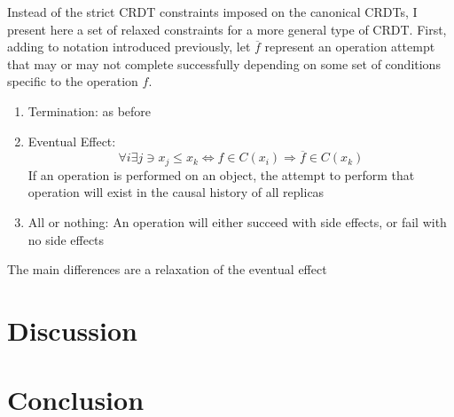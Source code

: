 \documentclass[twoside]{article}
\begin{document}
\begin{multicols}{2}
Instead of the strict CRDT constraints imposed on the canonical CRDTs,
I present here a set of relaxed constraints for a more general type of
CRDT. First, adding to notation introduced previously, let
$\overline{f}$ represent an operation attempt that may or may not
complete successfully depending on some set of conditions specific to
the operation $f$.
\begin{enumerate}
  \item Termination: as before
  \item Eventual Effect:
    \[\forall i\exists j\ni x_j\leq x_k \Leftrightarrow f\in
    C\left(x_i\right) \Rightarrow \overline{f}\in C\left(x_k\right) \]
    If an operation is performed on an object, the attempt to perform
    that operation will exist in the causal history of all replicas
  \item All or nothing:
    An operation will either succeed with side effects, or fail with
    no side effects
\end{enumerate}
The main differences are a relaxation of the eventual effect

\section{Discussion}
\section{Conclusion}


{}



\end{multicols}
\end{document}
